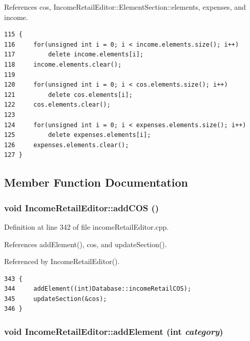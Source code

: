 References cos, Income\-Retail\-Editor::Element\-Section::elements, expenses, and income.

\footnotesize\begin{verbatim}115 {
116     for(unsigned int i = 0; i < income.elements.size(); i++)
117         delete income.elements[i];
118     income.elements.clear();
119     
120     for(unsigned int i = 0; i < cos.elements.size(); i++)
121         delete cos.elements[i];
122     cos.elements.clear();
123     
124     for(unsigned int i = 0; i < expenses.elements.size(); i++)
125         delete expenses.elements[i];
126     expenses.elements.clear();
127 }
\end{verbatim}\normalsize 




\subsection{Member Function Documentation}
\hypertarget{classIncomeRetailEditor_k3}{
\subsubsection[addCOS]{\setlength{\rightskip}{0pt plus 5cm}void Income\-Retail\-Editor::add\-COS ()}}
\label{classIncomeRetailEditor_k3}


Definition at line 342 of file income\-Retail\-Editor.cpp.

References add\-Element(), cos, and update\-Section().

Referenced by Income\-Retail\-Editor().

\footnotesize\begin{verbatim}343 {
344     addElement((int)Database::incomeRetailCOS);
345     updateSection(&cos);
346 }
\end{verbatim}\normalsize 


\hypertarget{classIncomeRetailEditor_k1}{
\subsubsection[addElement]{\setlength{\rightskip}{0pt plus 5cm}void Income\-Retail\-Editor::add\-Element (int {\em category})}}
\label{classIncomeRetailEditor_k1}


